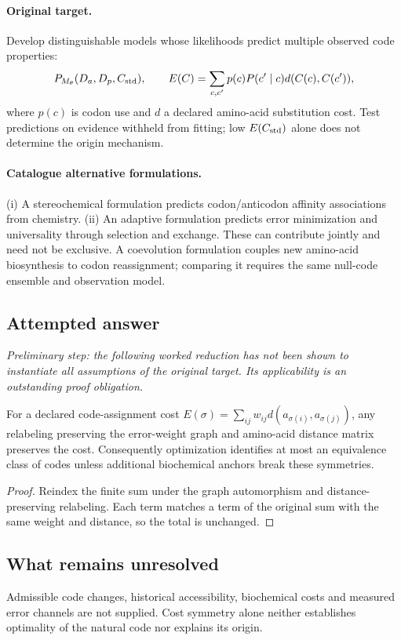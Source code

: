 \documentclass[11pt]{article}
\begin{document}
\paragraph{Original target.}
Develop distinguishable models whose likelihoods predict multiple observed code properties:
\[
P_{M_\theta}(D_a,D_p,C_{\rm std}),\qquad
E(C)=\sum_{c,c'}p(c)P(c'\mid c)d(C(c),C(c')),
\]
where $p(c)$ is codon use and $d$ a declared amino-acid substitution cost. Test predictions on evidence withheld from fitting; low $E(C_{\rm std})$ alone does not determine the origin mechanism.
\paragraph{Catalogue alternative formulations.}
(i) A stereochemical formulation predicts codon/anticodon affinity associations from chemistry. (ii) An adaptive formulation predicts error minimization and universality through selection and exchange. These can contribute jointly and need not be exclusive. A coevolution formulation couples new amino-acid biosynthesis to codon reassignment; comparing it requires the same null-code ensemble and observation model.
\subsection{Attempted answer}
\noindent\emph{Preliminary step: the following worked reduction has not been shown to instantiate all assumptions of the original target. Its applicability is an outstanding proof obligation.}

\begin{proposition}
For a declared code-assignment cost $E(\sigma)=\sum_{ij}w_{ij}d(a_{\sigma(i)},a_{\sigma(j)})$, any relabeling preserving the error-weight graph and amino-acid distance matrix preserves the cost. Consequently optimization identifies at most an equivalence class of codes unless additional biochemical anchors break these symmetries.
\end{proposition}
\begin{proof}
Reindex the finite sum under the graph automorphism and distance-preserving relabeling. Each term matches a term of the original sum with the same weight and distance, so the total is unchanged.
\end{proof}
\subsection{What remains unresolved}
Admissible code changes, historical accessibility, biochemical costs and measured error channels are not supplied. Cost symmetry alone neither establishes optimality of the natural code nor explains its origin.
\end{document}
